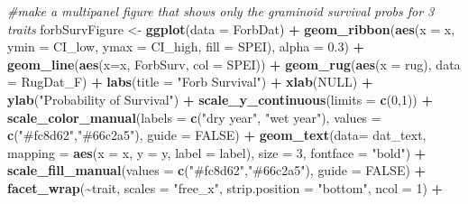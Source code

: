 \documentclass[
]{article}
\newenvironment{Shaded}{\begin{snugshade}}{\end{snugshade}}
\newcommand{\CommentTok}[1]{\textcolor[rgb]{0.56,0.35,0.01}{\textit{#1}}}
\newcommand{\DataTypeTok}[1]{\textcolor[rgb]{0.13,0.29,0.53}{#1}}
\newcommand{\DecValTok}[1]{\textcolor[rgb]{0.00,0.00,0.81}{#1}}
\newcommand{\FloatTok}[1]{\textcolor[rgb]{0.00,0.00,0.81}{#1}}
\newcommand{\KeywordTok}[1]{\textcolor[rgb]{0.13,0.29,0.53}{\textbf{#1}}}
\newcommand{\NormalTok}[1]{#1}
\newcommand{\OperatorTok}[1]{\textcolor[rgb]{0.81,0.36,0.00}{\textbf{#1}}}
\newcommand{\OtherTok}[1]{\textcolor[rgb]{0.56,0.35,0.01}{#1}}
\newcommand{\StringTok}[1]{\textcolor[rgb]{0.31,0.60,0.02}{#1}}
\begin{document}
\begin{Shaded}
\begin{Highlighting}[]
\CommentTok{\#make a multipanel figure that shows only the graminoid survival probs for 3 traits}
\NormalTok{forbSurvFigure \textless{}{-}}\StringTok{ }\KeywordTok{ggplot}\NormalTok{(}\DataTypeTok{data =}\NormalTok{ ForbDat) }\OperatorTok{+}
\StringTok{  }\KeywordTok{geom\_ribbon}\NormalTok{(}\KeywordTok{aes}\NormalTok{(}\DataTypeTok{x =}\NormalTok{ x, }\DataTypeTok{ymin =}\NormalTok{ CI\_low, }\DataTypeTok{ymax =}\NormalTok{ CI\_high, }\DataTypeTok{fill =}\NormalTok{ SPEI), }\DataTypeTok{alpha =} \FloatTok{0.3}\NormalTok{) }\OperatorTok{+}
\StringTok{  }\KeywordTok{geom\_line}\NormalTok{(}\KeywordTok{aes}\NormalTok{(}\DataTypeTok{x=}\NormalTok{x, ForbSurv, }\DataTypeTok{col =}\NormalTok{ SPEI))  }\OperatorTok{+}\StringTok{ }
\StringTok{  }\KeywordTok{geom\_rug}\NormalTok{(}\KeywordTok{aes}\NormalTok{(}\DataTypeTok{x =}\NormalTok{ rug), }\DataTypeTok{data =}\NormalTok{ RugDat\_F) }\OperatorTok{+}
\StringTok{  }\KeywordTok{labs}\NormalTok{(}\DataTypeTok{title =} \StringTok{"Forb Survival"}\NormalTok{) }\OperatorTok{+}
\StringTok{  }\KeywordTok{xlab}\NormalTok{(}\OtherTok{NULL}\NormalTok{) }\OperatorTok{+}
\StringTok{  }\KeywordTok{ylab}\NormalTok{(}\StringTok{"Probability of Survival"}\NormalTok{) }\OperatorTok{+}
\StringTok{  }\KeywordTok{scale\_y\_continuous}\NormalTok{(}\DataTypeTok{limits =} \KeywordTok{c}\NormalTok{(}\DecValTok{0}\NormalTok{,}\DecValTok{1}\NormalTok{)) }\OperatorTok{+}
\StringTok{  }\KeywordTok{scale\_color\_manual}\NormalTok{(}\DataTypeTok{labels =} \KeywordTok{c}\NormalTok{(}\StringTok{"dry year"}\NormalTok{, }\StringTok{"wet year"}\NormalTok{), }\DataTypeTok{values =} \KeywordTok{c}\NormalTok{(}\StringTok{"\#fc8d62"}\NormalTok{,}\StringTok{"\#66c2a5"}\NormalTok{), }\DataTypeTok{guide =} \OtherTok{FALSE}\NormalTok{) }\OperatorTok{+}
\StringTok{  }\KeywordTok{geom\_text}\NormalTok{(}\DataTypeTok{data=}\NormalTok{ dat\_text, }\DataTypeTok{mapping =} \KeywordTok{aes}\NormalTok{(}\DataTypeTok{x =}\NormalTok{ x, }\DataTypeTok{y =}\NormalTok{ y, }\DataTypeTok{label =}\NormalTok{ label), }\DataTypeTok{size =} \DecValTok{3}\NormalTok{, }\DataTypeTok{fontface =} \StringTok{"bold"}\NormalTok{) }\OperatorTok{+}
\StringTok{  }\KeywordTok{scale\_fill\_manual}\NormalTok{(}\DataTypeTok{values =} \KeywordTok{c}\NormalTok{(}\StringTok{"\#fc8d62"}\NormalTok{,}\StringTok{"\#66c2a5"}\NormalTok{), }\DataTypeTok{guide =} \OtherTok{FALSE}\NormalTok{) }\OperatorTok{+}
\StringTok{  }\KeywordTok{facet\_wrap}\NormalTok{(}\OperatorTok{\textasciitilde{}}\NormalTok{trait, }\DataTypeTok{scales =} \StringTok{"free\_x"}\NormalTok{, }\DataTypeTok{strip.position =}  \StringTok{"bottom"}\NormalTok{, }\DataTypeTok{ncol =} \DecValTok{1}\NormalTok{) }\OperatorTok{+}

\end{Highlighting}
\end{Shaded}
\end{document}
